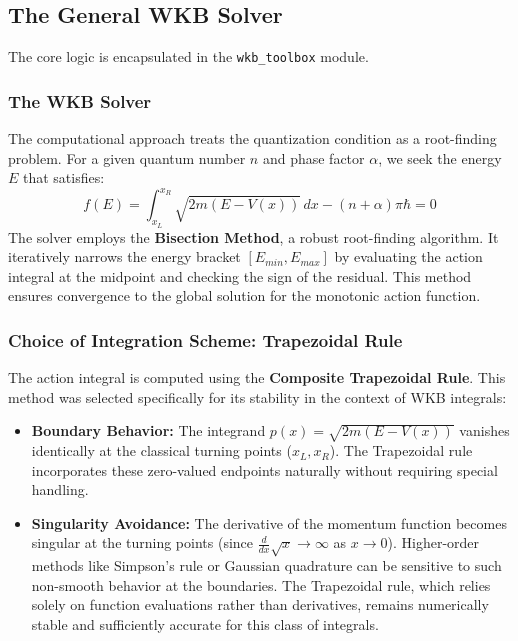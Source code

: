 \documentclass[12pt, a4paper, twoside]{article}
\begin{document}
        \subsection{The General WKB Solver}
        The core logic is encapsulated in the \texttt{wkb\_toolbox} module.
        
        \subsubsection*{The WKB Solver}
        The computational approach treats the quantization condition as a root-finding problem. For a given quantum number $n$ and phase factor $\alpha$, we seek the energy $E$ that satisfies:
        $$ f(E) = \int_{x_L}^{x_R} \sqrt{2m(E - V(x))} \, dx - (n + \alpha)\pi \hbar = 0 $$
        The solver employs the \textbf{Bisection Method}, a robust root-finding algorithm. It iteratively narrows the energy bracket $[E_{min}, E_{max}]$ by evaluating the action integral at the midpoint and checking the sign of the residual. This method ensures convergence to the global solution for the monotonic action function.
        
        \subsubsection*{Choice of Integration Scheme: Trapezoidal Rule}
        The action integral is computed using the \textbf{Composite Trapezoidal Rule}. This method was selected specifically for its stability in the context of WKB integrals:
        \begin{itemize}
            \item \textbf{Boundary Behavior:} The integrand $p(x) = \sqrt{2m(E-V(x))}$ vanishes identically at the classical turning points ($x_L, x_R$). The Trapezoidal rule incorporates these zero-valued endpoints naturally without requiring special handling.
            \item \textbf{Singularity Avoidance:} The derivative of the momentum function becomes singular at the turning points (since $\frac{d}{dx}\sqrt{x} \to \infty$ as $x \to 0$). Higher-order methods like Simpson's rule or Gaussian quadrature can be sensitive to such non-smooth behavior at the boundaries. The Trapezoidal rule, which relies solely on function evaluations rather than derivatives, remains numerically stable and sufficiently accurate for this class of integrals.
        \end{itemize}
        
    
\end{document}
